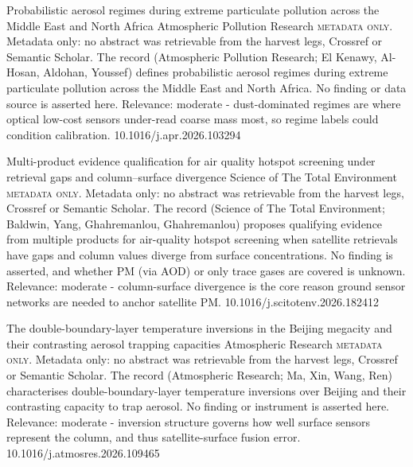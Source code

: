 \documentclass[10pt]{article}
\begin{document}
{Probabilistic aerosol regimes during extreme particulate pollution across the Middle East and North Africa}
{Atmospheric Pollution Research}
{\textsc{metadata only.} Metadata only: no abstract was retrievable from the harvest legs, Crossref or Semantic Scholar. The record (Atmospheric Pollution Research; El Kenawy, Al-Hosan, Aldohan, Youssef) defines probabilistic aerosol regimes during extreme particulate pollution across the Middle East and North Africa. No finding or data source is asserted here. Relevance: moderate - dust-dominated regimes are where optical low-cost sensors under-read coarse mass most, so regime labels could condition calibration.}
{10.1016/j.apr.2026.103294}

{Multi-product evidence qualification for air quality hotspot screening under retrieval gaps and column–surface divergence}
{Science of The Total Environment}
{\textsc{metadata only.} Metadata only: no abstract was retrievable from the harvest legs, Crossref or Semantic Scholar. The record (Science of The Total Environment; Baldwin, Yang, Ghahremanlou, Ghahremanlou) proposes qualifying evidence from multiple products for air-quality hotspot screening when satellite retrievals have gaps and column values diverge from surface concentrations. No finding is asserted, and whether PM (via AOD) or only trace gases are covered is unknown. Relevance: moderate - column-surface divergence is the core reason ground sensor networks are needed to anchor satellite PM.}
{10.1016/j.scitotenv.2026.182412}

{The double-boundary-layer temperature inversions in the Beijing megacity and their contrasting aerosol trapping capacities}
{Atmospheric Research}
{\textsc{metadata only.} Metadata only: no abstract was retrievable from the harvest legs, Crossref or Semantic Scholar. The record (Atmospheric Research; Ma, Xin, Wang, Ren) characterises double-boundary-layer temperature inversions over Beijing and their contrasting capacity to trap aerosol. No finding or instrument is asserted here. Relevance: moderate - inversion structure governs how well surface sensors represent the column, and thus satellite-surface fusion error.}
{10.1016/j.atmosres.2026.109465}
\end{document}
